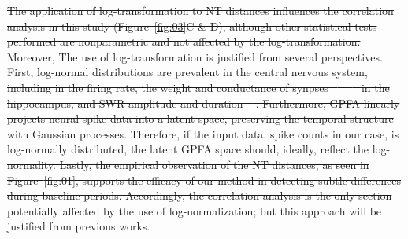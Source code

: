 \documentclass[preprint,review,12pt]{elsarticle}%
\providecommand{\DIFdeltex}[1]{{\protect\color{red}\sout{#1}}}                      %
\providecommand{\DIFdelbegin}{} %
\providecommand{\DIFdelend}{} %
\providecommand{\DIFdel}[1]{\texorpdfstring{\DIFdeltex{#1}}{}} %
\newcommand{\DIFscaledelfig}{0.5}
\newlength{\DIFdelgraphicswidth} %
\newlength{\DIFdelgraphicsheight} %
\newcommand{\DIFdelincludegraphics}[2][]{%
\sbox{\DIFdelgraphicsbox}{\DIFOincludegraphics[#1]{#2}}%
\settoboxwidth{\DIFdelgraphicswidth}{\DIFdelgraphicsbox} %
\settoboxtotalheight{\DIFdelgraphicsheight}{\DIFdelgraphicsbox} %
\scalebox{\DIFscaledelfig}{%
\parbox[b]{\DIFdelgraphicswidth}{\usebox{\DIFdelgraphicsbox}\\[-\baselineskip] \rule{\DIFdelgraphicswidth}{0em}}\llap{\resizebox{\DIFdelgraphicswidth}{\DIFdelgraphicsheight}{%
\setlength{\unitlength}{\DIFdelgraphicswidth}%
\begin{picture}(1,1)%
\thicklines\linethickness{2pt} %
{\color[rgb]{1,0,0}\put(0,0){\framebox(1,1){}}}%
{\color[rgb]{1,0,0}\put(0,0){\line( 1,1){1}}}%
{\color[rgb]{1,0,0}\put(0,1){\line(1,-1){1}}}%
\end{picture}%
}\hspace*{3pt}}} %
} %
\DeclareRobustCommand{\DIFdelbegin}{\DIFOdelbegin \let\includegraphics\DIFdelincludegraphics} %
\DeclareRobustCommand{\DIFdelend}{\DIFOaddend \let\includegraphics\DIFOincludegraphics} %
\begin{document}
\DIFdelbegin \DIFdel{The application of log-transformation to NT distances influences the correlation analysis in this study (Figure~\ref{fig:03}C \& D), although other statistical tests performed are nonparametric and not affected by the log-transformation. Moreover, The use of log-transformation is justified from several perspectives. First, log-normal distributions are prevalent in the central nervous system, including in the firing rate, the weight and conductance of synpses \mbox{%
\cite{buzsaki_log-dynamic_2014} }\hspace{0pt}%
\mbox{%
\cite{ikegaya_interpyramid_2013} }\hspace{0pt}%
in the hippocampus, and SWR amplitude and duration \mbox{%
\cite{liu_consensus_2022}}\hspace{0pt}%
. Furthermore, GPFA linearly projects neural spike data into a latent space, preserving the temporal structure with Gaussian processes. Therefore, if the input data, spike counts in our case, is log-normally distributed, the latent GPFA space should, ideally, reflect the log-normality. Lastly, the empirical observation of the NT distances, as seen in Figure~\ref{fig:01}, supports the efficacy of our method in detecting subtle differences during baseline periods. Accordingly, the correlation analysis is the only section potentially affected by the use of log-normalization; but this approach will be justified from previous works.
}\DIFdelend %
\end{document}
